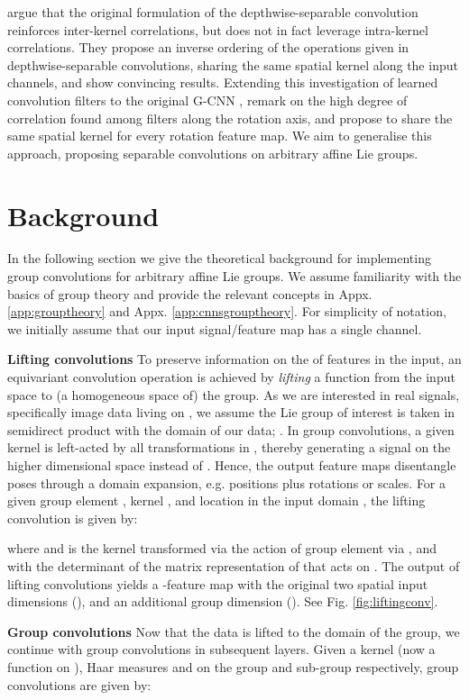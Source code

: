 \documentclass[nohyperref]{article}
\theoremstyle{plain}
\theoremstyle{definition}
\theoremstyle{remark}
\begin{document}
\citet{haase2020rethinking} argue that the original formulation of the depthwise-separable convolution reinforces inter-kernel correlations, but does not in fact leverage intra-kernel correlations. They propose an inverse ordering of the operations given in depthwise-separable convolutions, sharing the same spatial kernel along the input channels, and show convincing results. Extending this investigation of learned convolution filters to the original G-CNN \citep{cohen2016group}, \citet{lengyel2021exploiting} remark on the high degree of correlation found among filters along the rotation axis, and propose to share the same spatial kernel for every rotation feature map. We aim to generalise this approach, proposing separable convolutions on arbitrary affine Lie groups.
\section{Background}
In the following section we give the theoretical background for implementing group convolutions for arbitrary affine Lie groups. We assume familiarity with the basics of group theory and provide the relevant concepts in Appx. \ref{app:grouptheory} and Appx. \ref{app:cnnsgrouptheory}. For simplicity of notation, we initially assume that our input signal/feature map  has a single channel.

\textbf{Lifting convolutions} To preserve information on the  of features in the input, an equivariant convolution operation is achieved by \textit{lifting} a function from the input space to (a homogeneous space of) the group. As we are interested in real signals, specifically image data living on , we assume the Lie group of interest  is taken in semidirect product with the domain of our data; . In group convolutions, a given kernel is left-acted by all transformations in , thereby generating a signal on the higher dimensional space  instead of . Hence, the output feature maps disentangle poses through a domain expansion, e.g. positions plus rotations or scales. For a given group element , kernel , and location  in the input domain , the lifting convolution is given by:

where  and  is the kernel  transformed via the action of group element  via , and with  the determinant of the matrix representation of  that acts on . The output of lifting convolutions yields a -feature map with the original two spatial input dimensions (), and an additional group dimension (). See Fig. \ref{fig:liftingconv}.

\textbf{Group convolutions}
Now that the data is lifted to the domain of the group, we continue with group convolutions in subsequent layers. Given a kernel  (now a function on ), Haar measures  and  on the group  and sub-group  respectively, group convolutions are given by:
\end{document}
